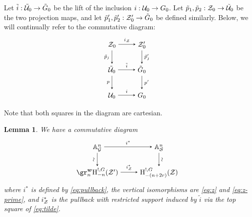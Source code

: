 \documentclass[a4paper,10pt,leqno]{amsart}
\theoremstyle{plain}
\theoremstyle{plain}
\theoremstyle{plain}
\newtheorem{lem}[thm]{Lemma}
\theoremstyle{definition}
\theoremstyle{remark}
\begin{document}
Let $\tilde{i} : \tilde{\cal{U}}_0 \to \tilde{G}_0$ be the lift of the inclusion $i : \cal{U}_0 \to G_0$.
Let $\tilde{p}_1, \tilde{p}_2 :\cal{Z}_0 \to \tilde{\cal{U}}_0$ be the two projection maps, and let $\tilde{p}'_1, \tilde{p}'_2 : \cal{Z}'_0 \to \tilde{G}_0$ be defined similarly.
Below, we will continually refer to the commutative diagram:
\begin{equation}\label{eq:tilde}
\begin{tikzpicture}[baseline=(current bounding box.center), >=stealth]
\matrix(m)[matrix of math nodes, row sep=2em, column sep=2.5em, text height=2ex, text depth=0.5ex]
{	\cal{Z}_0
		&\cal{Z}'_0\\
	\tilde{\cal{U}}_0
		&\tilde{G}_0\\
	\cal{U}_0
		&G_0\\
		};
\path[->,font=\scriptsize, auto]
(m-1-1)		edge node{$i_\cal{Z}$} (m-1-2)
(m-1-1)		edge node[left]{$\tilde{p}_j$} (m-2-1)
(m-1-2)		edge node{$\tilde{p}'_j$} (m-2-2)
(m-2-1)		edge node{$\tilde{i}$} (m-2-2)
(m-2-1)		edge node[left]{$p$} (m-3-1)
(m-2-2)		edge node{$p'$} (m-3-2)
(m-3-1)		edge node{$i$} (m-3-2);
\end{tikzpicture}
\end{equation}
Note that both squares in the diagram are cartesian.

\begin{lem}
We have a commutative diagram
\begin{equation}
\begin{tikzpicture}[baseline=(current bounding box.center), >=stealth]
\matrix(m)[matrix of math nodes, row sep=2em, column sep=2.5em, text height=2ex, text depth=0.5ex]
{	\bb{A}_\cal{G}^n
		&\bb{A}_\cal{S}^n\\
	\gr_n^{\bm{w}} \ur{H}_{-n}^{!, G}(\cal{Z}')
		&\ur{H}_{-(n + 2r)}^{!, G}(\cal{Z})\\
		};
\path[->,font=\scriptsize, auto]
(m-1-1)		edge node{$i^\ast$} (m-1-2)
(m-1-1)		edge node[rotate=90,above]{$\sim$} (m-2-1)
(m-1-2)		edge node[rotate=90,below]{$\sim$} (m-2-2)
(m-2-1)		edge node{$i_\cal{Z}^\ast$} (m-2-2);
\end{tikzpicture}
\end{equation}
where $i^\ast$ is defined by \eqref{eq:pullback}, the vertical isomorphisms are \eqref{eq:z} and \eqref{eq:z-prime}, and $i_\cal{Z}^\ast$ is the pullback with restricted support induced by $\tilde{i}$ via the top square of \eqref{eq:tilde}.
\end{lem}
\end{document}
